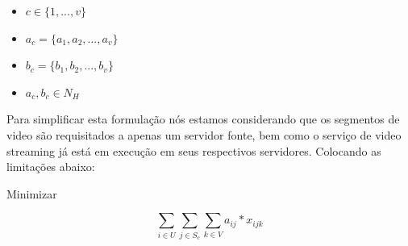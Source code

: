 \vspace{0.5cm}
\begin{itemize}

\item  $c \in \{1,...,v\}$

\item  $a_{c} = \{a_{1},a_{2},...,a_{v}\}$

\item  $b_{c} = \{b_{1},b_{2},...,b_{v}\}$

\item  $a_{c},b_{c} \in N_{H}$

\end{itemize}
\vspace{0.5cm}

%


Para simplificar esta formulação nós estamos considerando que os segmentos de video são requisitados a apenas um servidor fonte, bem como o serviço de video streaming já está em execução em seus respectivos servidores. Colocando as limitações abaixo:%


\vspace{0.5cm}


Minimizar

\begin{equation}\label{maximize}
\sum_{i \in U} 
\sum_{j \in S_{c}}
\sum_{k \in V}
a_{ij} \ast x_{ijk}
\end{equation}

